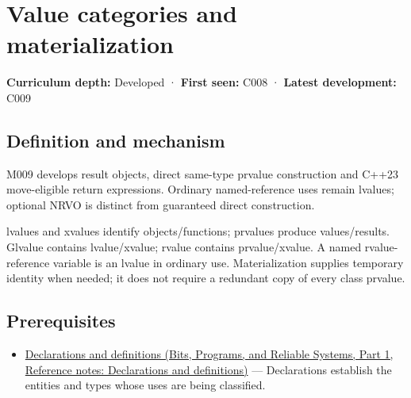 \hypertarget{appendix-1121b30eaeb0}{}\label{referencestart:appendix-1121b30eaeb0}
\section{Value categories and materialization}\label{appendix-1121b30eaeb0-value-categories-and-materialization}

\hypertarget{appendix-1121b30eaeb0-value-categories-and-materialization}{}

\textbf{Curriculum depth:} Developed · \textbf{First seen:} C008 · \textbf{Latest development:} C009

\begin{allmightroledefinition}

\subsection{Definition and mechanism}\label{appendix-1121b30eaeb0-definition-and-mechanism}

\hypertarget{appendix-1121b30eaeb0-definition-and-mechanism}{}

M009 develops result objects, direct same-type prvalue construction and C++23 move-eligible return expressions. Ordinary named-reference uses remain lvalues; optional NRVO is distinct from guaranteed direct construction.

\end{allmightroledefinition}

lvalues and xvalues identify objects/functions; prvalues produce values/results. Glvalue contains lvalue/xvalue; rvalue contains prvalue/xvalue. A named rvalue-reference variable is an lvalue in ordinary use. Materialization supplies temporary identity when needed; it does not require a redundant copy of every class prvalue.

\subsection{Prerequisites}\label{appendix-1121b30eaeb0-prerequisites}

\hypertarget{appendix-1121b30eaeb0-prerequisites}{}

\begin{itemize}
\tightlist
\item
  \href{../01-Bits-Programs-and-Reliable-Systems-P01/main.pdf\#appendix-2e4d494c2d94}{Declarations and definitions (Bits, Programs, and Reliable Systems, Part 1, Reference notes: Declarations and definitions)} --- Declarations establish the entities and types whose uses are being classified.
\end{itemize}

